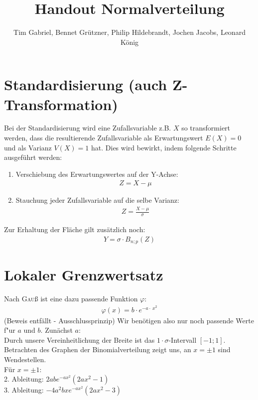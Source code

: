 \documentclass[12pt,a4paper,twocolumn]{article}
\author{Tim Gabriel, Bennet Grützner, Philip Hildebrandt, Jochen Jacobs, Leonard König}
\title{Handout Normalverteilung}
\begin{document}
\maketitle

\section{Standardisierung (auch Z-Transformation)}
Bei der Standardisierung wird eine Zufallsvariable z.B. $X$ so transformiert werden, dass die resultierende Zufallsvariable als Erwartungswert $E(X) = 0$ und als Varianz $V(X)=1$ hat. Dies wird bewirkt, indem folgende Schritte ausgeführt werden:
\begin{enumerate}
\item Verschiebung des Erwartungswertes auf der Y-Achse:
\begin{eqnarray}
  Z = X - \mu
\end{eqnarray}
\item Stauchung jeder Zufallsvariable auf die selbe Varianz:
\begin{eqnarray}
  Z = \frac{X - \mu}{\sigma}
\end{eqnarray}
\end{enumerate}
Zur Erhaltung der Fläche gilt zusätzlich noch:
\begin{eqnarray}
	Y = \sigma \cdot B_{n;p}(Z)
\end{eqnarray}



\section{Lokaler Grenzwertsatz}

Nach \textrm{\textsc{Gau}ß} ist eine dazu passende Funktion $\varphi$:
\begin{eqnarray}
\varphi(x)=b\cdot e^{-a\cdot\ x^2} \label{eq_gauss}
\end{eqnarray}
(Beweis entfällt \-- Ausschlussprinzip)
Wir benötigen also nur noch passende Werte f"ur $a$ und $b$. Zunächst $a$:\\ 

Durch unsere Vereinheitlichung der Breite ist das $1\cdot \sigma$-Intervall $[-1;1]$. Betrachten des Graphen der Binomialverteilung zeigt uns, an $x=\pm 1$ sind Wendestellen.\\
Für $x=\pm 1$:\\

2. Ableitung: $2abe^{-ax^2} (2ax^2-1)$\\
3. Ableitung: $-4 a^{2} b x e^{-a x^2}(2 a x^2 -3)$\\
\end{document}
